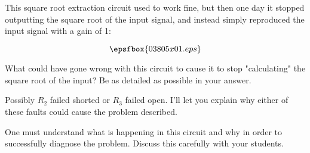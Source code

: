 

This square root extraction circuit used to work fine, but then one day it stopped outputting the square root of the input signal, and instead simply reproduced the input signal with a gain of 1:

$$\epsfbox{03805x01.eps}$$

What could have gone wrong with this circuit to cause it to stop "calculating" the square root of the input?  Be as detailed as possible in your answer.







Possibly $R_2$ failed shorted or $R_3$ failed open.  I'll let you explain why either of these faults could cause the problem described.







One must understand what is happening in this circuit and why in order to successfully diagnose the problem.  Discuss this carefully with your students.




